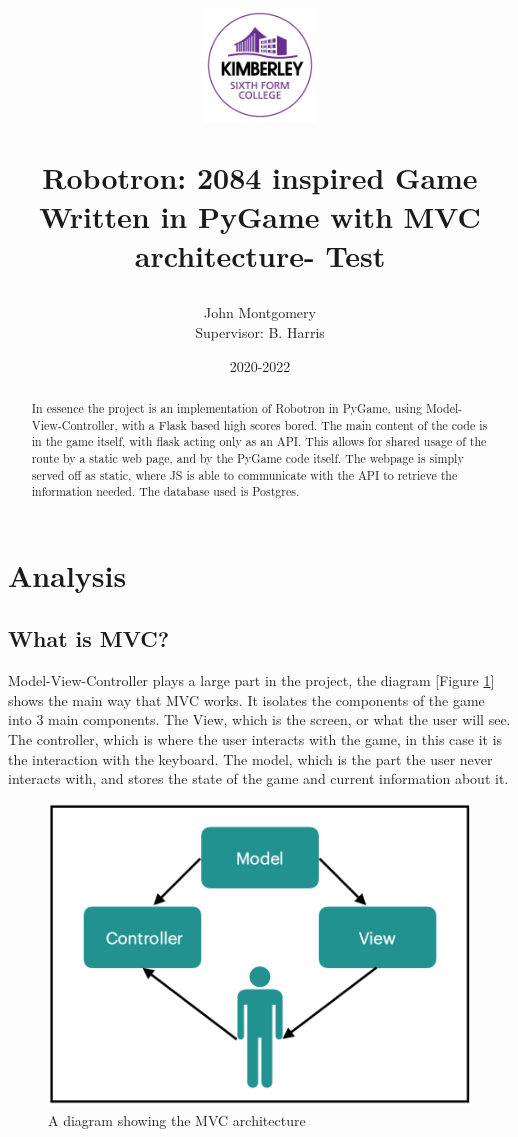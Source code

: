 \documentclass{article}
\title{%
    
    \begin{center}
        \includegraphics[width=3cm]{kimberley.png}
        \centering
    \end{center}
  Robotron: 2084 inspired Game \\
  \large Written in PyGame with MVC architecture- Test}
\author{John Montgomery\\ {\small Supervisor: B. Harris}}
\date{2020-2022}
\begin{document}
\maketitle
\begin{abstract}
    In essence the project is an implementation of Robotron in PyGame, using Model-View-Controller, with a Flask based high scores bored. The main content of the code is in the game itself, with flask acting only as an API. This allows for shared usage of the route by a static web page, and by the PyGame code itself. The webpage is simply served off as static, where JS is able to communicate with the API to retrieve the information needed. The database used is Postgres. 
\end{abstract}
\newpage
\tableofcontents
\newpage
\listoffigures
\newpage
\section{Analysis}
\subsection{What is MVC?}
Model-View-Controller plays a large part in the project, the diagram [Figure \ref{fig:MVC_overview}] shows the main way that MVC works. It isolates the components of the game into 3 main components. The View, which is the screen, or what the user will see. The controller, which is where the user interacts with the game, in this case it is the interaction with the keyboard. The model, which is the part the user never interacts with, and stores the state of the game and current information about it.

\begin{figure}[h]
  \includegraphics[width=\linewidth]{MVC overview.png}
  \caption{A diagram showing the MVC architecture}
  \label{fig:MVC_overview}
\end{figure}
\end{document}
